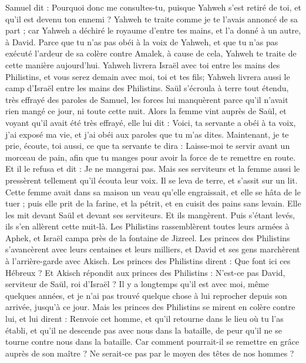\begin{multicols}{2}
Samuel dit : Pourquoi donc me consultes-tu, puisque Yahweh s'est retiré de toi, et qu'il est devenu ton ennemi ?
Yahweh te traite comme je te l’avais annoncé de sa part ; car Yahweh a déchiré le royaume d'entre tes mains, et l'a donné à un autre, à David.
Parce que tu n'as pas obéi à la voix de Yahweh, et que tu n'as pas exécuté l'ardeur de sa colère contre Amalek, à cause de cela, Yahweh te traite de cette manière aujourd'hui.
Yahweh livrera Israël avec toi entre les mains des Philistins, et vous serez demain avec moi, toi et tes fils; Yahweh livrera aussi le camp d'Israël entre les mains des Philistins.
Saül s’écroula à terre tout étendu, très effrayé des paroles de Samuel, les forces lui manquèrent parce qu'il n'avait rien mangé ce jour, ni toute cette nuit.
Alors la femme vint auprès de Saül, et voyant qu'il avait été très effrayé, elle lui dit : Voici, ta servante a obéi à ta voix, j'ai exposé ma vie, et j'ai obéi aux paroles que tu m'as dites.
Maintenant, je te prie, écoute, toi aussi, ce que ta servante te dira : Laisse-moi te servir avant un morceau de pain, afin que tu manges pour avoir la force de te remettre en route.
Et il le refusa et dit : Je ne mangerai pas. Mais ses serviteurs et la femme aussi le pressèrent tellement qu'il écouta leur voix. Il se leva de terre, et s'assit sur un lit.
Cette femme avait dans sa maison un veau qu'elle engraissait, et elle se hâta de le tuer ; puis elle prit de la farine, et la pétrit, et en cuisit des pains sans levain.
Elle les mit devant Saül et devant ses serviteurs. Et ils mangèrent. Puis s'étant levés, ils s'en allèrent cette nuit-là.
\VerseOne{}Les Philistins rassemblèrent toutes leurs armées à Aphek, et Israël campa près de la fontaine de Jizreel.
Les princes des Philistins s’avancèrent avec leurs centaines et leurs milliers, et David et ses gens marchèrent à l'arrière-garde avec Akisch.
Les princes des Philistins dirent : Que font ici ces Hébreux ? Et Akisch répondit aux princes des Philistins : N'est-ce pas David, serviteur de Saül, roi d'Israël ? Il y a longtemps qu’il est avec moi, même quelques années, et je n'ai pas trouvé quelque chose à lui reprocher depuis son arrivée, jusqu'à ce jour.
Mais les princes des Philistins se mirent en colère contre lui, et lui dirent : Renvoie cet homme, et qu'il retourne dans le lieu où tu l'as établi, et qu'il ne descende pas avec nous dans la bataille, de peur qu'il ne se tourne contre nous dans la bataille. Car comment pourrait-il se remettre en grâce auprès de son maître ? Ne serait-ce pas par le moyen des têtes de nos hommes ?

\end{multicols}
